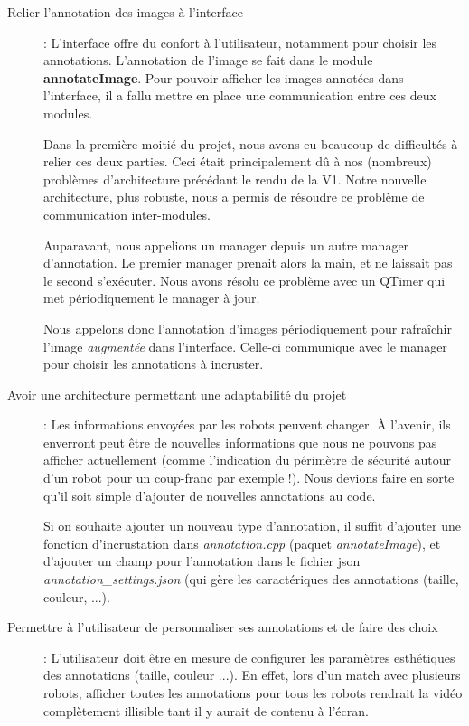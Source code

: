 \begin{description}
    \item[Relier l'annotation des images à l'interface]: 
    L'interface offre du confort à l'utilisateur, notamment pour 
    choisir les annotations. L'annotation de l'image se fait dans
    le module \textbf{annotateImage}. Pour pouvoir afficher les
    images annotées dans l'interface, il a fallu mettre en place 
    une communication entre ces deux modules.
    \bigskip
    
     Dans la première moitié du projet, nous avons eu beaucoup de
     difficultés à relier ces deux parties. Ceci était
     principalement dû à nos (nombreux) problèmes d'architecture 
     précédant le rendu de la V1. Notre nouvelle architecture, 
     plus robuste, nous a permis de résoudre ce problème de 
     communication inter-modules. 
    \bigskip
    
    Auparavant, nous appelions un manager depuis un autre manager
    d'annotation. Le premier manager prenait alors la main, et ne
    laissait pas le second s'exécuter. Nous avons résolu ce 
    problème avec un QTimer qui met périodiquement le manager à 
    jour.
    \bigskip
    
    Nous appelons donc l'annotation d'images périodiquement pour 
    rafraîchir l'image \textit{augmentée} dans l'interface. 
    Celle-ci communique avec le manager pour choisir les 
    annotations à incruster.
    \bigskip
    
    \newpage
    \item[Avoir une architecture permettant une adaptabilité du 
    projet]: Les informations envoyées par les robots peuvent 
    changer. À l'avenir, ils enverront peut être de nouvelles 
    informations que nous ne pouvons pas afficher actuellement 
    (comme l'indication du périmètre de sécurité autour d'un 
    robot pour un coup-franc par exemple !). Nous devions faire 
    en sorte qu'il soit simple d'ajouter de nouvelles annotations
    au code. 
    \bigskip
    
   Si on souhaite ajouter un nouveau type d'annotation, il suffit
   d'ajouter une fonction d'incrustation dans
   \textit{annotation.cpp} (paquet \textit{annotateImage}), et
   d'ajouter un champ pour l'annotation dans le fichier json 
   \textit{annotation\_settings.json} (qui gère les caractériques
   des annotations (taille, couleur, ...).
   \bigskip
   
    \item[Permettre à l'utilisateur de personnaliser ses
    annotations et de faire des choix]: L'utilisateur doit être 
    en mesure de configurer les paramètres esthétiques des 
    annotations (taille, couleur ...). En effet, lors d'un match 
    avec plusieurs robots, afficher toutes les annotations pour 
    tous les robots rendrait la vidéo complètement illisible tant
    il y aurait de contenu à l'écran. 
    \bigskip
    

\end{description}
